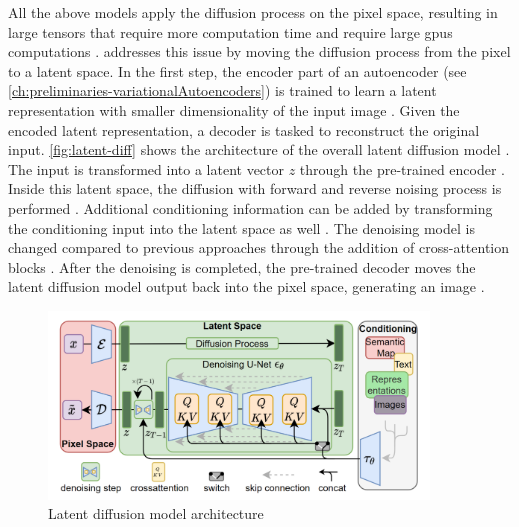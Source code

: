 All the above models apply the diffusion process on the pixel space, resulting in large tensors that require more computation time and require large \glspl{gpu} computations \cite{rombach2022HighResolutionImageSynthesis}.
\cite{rombach2022HighResolutionImageSynthesis} addresses this issue by moving the diffusion process from the pixel to a latent space.
In the first step, the encoder part of an autoencoder (see \autoref{ch:preliminaries-variationalAutoencoders}) is trained to learn a latent representation with smaller dimensionality of the input image \cite{rombach2022HighResolutionImageSynthesis}.
Given the encoded latent representation, a decoder is tasked to reconstruct the original input.
\autoref{fig:latent-diff} shows the architecture of the overall latent diffusion model \cite[Figure 3, p.4]{rombach2022HighResolutionImageSynthesis}.
The input is transformed into a latent vector $z$ through the pre-trained encoder \cite{rombach2022HighResolutionImageSynthesis}.
Inside this latent space, the diffusion with forward and reverse noising process is performed \cite{rombach2022HighResolutionImageSynthesis}.
Additional conditioning information can be added by transforming the conditioning input into the latent space as well \cite{rombach2022HighResolutionImageSynthesis}.
The denoising model is changed compared to previous approaches through the addition of cross-attention blocks \cite{rombach2022HighResolutionImageSynthesis}.
After the denoising is completed, the pre-trained decoder moves the latent diffusion model output back into the pixel space, generating an image \cite{rombach2022HighResolutionImageSynthesis}.

\begin{figure}[h]
    \centering
    \includegraphics[width=0.9\textwidth]{images/latent-diff.png}
    \caption[Latent Diffusion Model]{Latent diffusion model architecture \cite[Figure 3, p.4]{rombach2022HighResolutionImageSynthesis}}
    \label{fig:latent-diff}
\end{figure}

